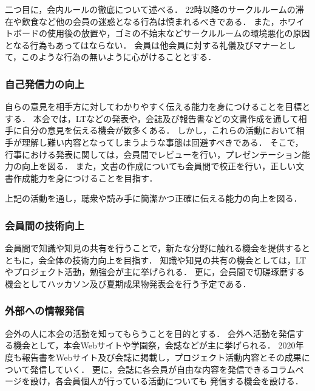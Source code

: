   二つ目に，会内ルールの徹底について述べる．
  22時以降のサークルルームの滞在や飲食など他の会員の迷惑となる行為は慎まれるべきである．
  また，ホワイトボードの使用後の放置や，ゴミの不始末などサークルルームの環境悪化の原因となる行為もあってはならない．
  会員は他会員に対する礼儀及びマナーとして，このような行為の無いように心がけることとする．
  
\subsubsection*{自己発信力の向上}
  自らの意見を相手方に対してわかりやすく伝える能力を身につけることを目標とする．
  本会では，LTなどの発表や，会誌及び報告書などの文書作成を通して相手に自分の意見を伝える機会が数多くある．
  しかし，これらの活動において相手が理解し難い内容となってしまうような事態は回避すべきである．
  そこで，行事における発表に関しては，会員間でレビューを行い，プレゼンテーション能力の向上を図る．
  また，文書の作成についても会員間で校正を行い，正しい文書作成能力を身につけることを目指す．

  上記の活動を通し，聴衆や読み手に簡潔かつ正確に伝える能力の向上を図る．

\subsubsection*{会員間の技術向上}
  会員間で知識や知見の共有を行うことで，新たな分野に触れる機会を提供するとともに，会全体の技術力向上を目指す．
  知識や知見の共有の機会としては，LTやプロジェクト活動，勉強会が主に挙げられる．
  更に，会員間で切磋琢磨する機会としてハッカソン及び夏期成果物発表会を行う予定である．

\subsubsection*{外部への情報発信}
  会外の人に本会の活動を知ってもらうことを目的とする．
  会外へ活動を発信する機会として，本会Webサイトや学園祭，会誌などが主に挙げられる．
  2020年度も報告書をWebサイト及び会誌に掲載し，プロジェクト活動内容とその成果について発信していく．
  更に，会誌に各会員が自由な内容を発信できるコラムページを設け，各会員個人が行っている活動についても
  発信する機会を設ける．

